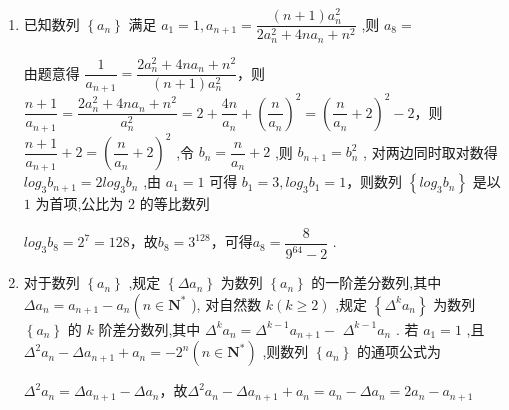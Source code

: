 \begin{enumerate}
\begin{jieda}
        两式相加可得${a}_{n + 1} - {a}_{n - 2} + {a}_{n + 2} - {a}_{n - 1} = 2({a}_{n+1} - {a}_{n - 1})$，即$a_{n+2} - a_{n+1} = -(a_{n-1}-a_{n-2})$

        故${a}_{2021} - {a}_{2022} = {a}_{3} - {a}_{2} = 2(100-10)+1 - 100 = 81$
    \end{jieda}
    \item 已知数列 $\left\{  {a}_{n}\right\}$ 满足 ${a}_{1} = 1,{a}_{n + 1} = \dfrac{\left( {n + 1}\right) {a}_{n}^{2}}{2{a}_{n}^{2} + {4n}{a}_{n} + {n}^{2}}$ ,则 ${a}_{8} =$ 
    \begin{jieda}
        由题意得 $\dfrac{1}{{a}_{n + 1}} = \dfrac{2{a}_{n}^{2} + {4n}{a}_{n} + {n}^{2}}{\left( {n + 1}\right) {a}_{n}^{2}}$，则 $\dfrac{n + 1}{{a}_{n + 1}} = \dfrac{2{a}_{n}^{2} + {4n}{a}_{n} + {n}^{2}}{{a}_{n}^{2}} = 2 + \dfrac{4n}{{a}_{n}} + {\left( \dfrac{n}{{a}_{n}}\right) }^{2} = {\left( \dfrac{n}{{a}_{n}} + 2\right) }^{2} - 2$，则 $\dfrac{n + 1}{{a}_{n + 1}} + 2 = {\left( \dfrac{n}{{a}_{n}} + 2\right) }^{2}$ ,令 ${b}_{n} = \dfrac{n}{{a}_{n}} + 2$ ,则 ${b}_{n + 1} = {b}_{n}^{2}$ ,
        对两边同时取对数得 $log_3 {b}_{n + 1} = 2log_3 {b}_{n}$ ,由 ${a}_{1} = 1$ 可得 ${b}_{1} = 3,log_3 {b}_{1} = 1$，则数列 $\left\{  {log_3 {b}_{n}}\right\}$ 是以 $1$ 为首项,公比为 2 的等比数列

        
        $log_3 {b}_{8} = {2}^{7} = 128$，故${b}_{8} = {3}^{128}$，可得${a}_{8} = \dfrac{8}{{9}^{64} - 2}$ .
    \end{jieda}
    \item 对于数列 $\left\{  {a}_{n}\right\}$ ,规定 $\left\{  {\Delta {a}_{n}}\right\}$ 为数列 $\left\{  {a}_{n}\right\}$ 的一阶差分数列,其中 $\Delta {a}_{n} = {a}_{n + 1} - {a}_{n}\left( {n \in  {\mathbf{N}}^{ * }}\right.$ ), 对自然数 $k\left( {k \geq  2}\right)$ ,规定 $\left\{  {{\Delta }^{k}{a}_{n}}\right\}$ 为数列 $\left\{  {a}_{n}\right\}$ 的 $k$ 阶差分数列,其中 ${\Delta }^{k}{a}_{n} = {\Delta }^{k - 1}{a}_{n + 1} -$  ${\Delta }^{k - 1}{a}_{n}$ . 若 ${a}_{1} = 1$ ,且 ${\Delta }^{2}{a}_{n} - \Delta {a}_{n + 1} + {a}_{n} =  - {2}^{n}\left( {n \in  {\mathbf{N}}^{ * }}\right)$ ,则数列 $\left\{  {a}_{n}\right\}$ 的通项公式为
    \begin{jieda}
        $\Delta^2a_n = \Delta a_{n+1} - \Delta a_n$，故${\Delta }^{2}{a}_{n} - \Delta {a}_{n + 1} + {a}_{n} = a_n - \Delta a_n = 2a_n - a_{n+1}$


\end{jieda}
\end{enumerate}
